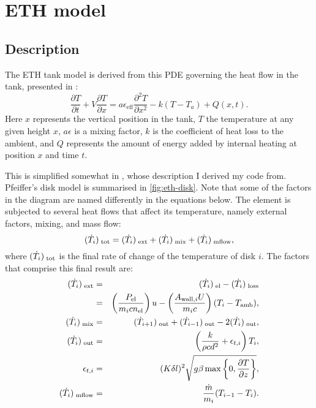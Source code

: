 \documentclass{article}
\begin{document}
\section{ETH model}

\subsection{Description}

The ETH tank model is derived from this PDE governing the heat flow in the tank, presented in \textcite{Vrettos12}:
\begin{equation} \label{eq:eth-pde}
   \frac{\partial T}{\partial t} + V \frac{\partial T}{\partial x}
   = a \epsilon_{\text{eff}} \frac{\partial^2 T}{\partial x^2}
   - k(T - T_a)
   + Q(x, t).
\end{equation}
Here $x$ represents the vertical position in the tank, $T$ the temperature at any given height $x$, $a\epsilon$ is a mixing factor, $k$ is the coefficient of heat loss to the ambient, and $Q$ represents the amount of energy added by internal heating at position $x$ and time $t$.

This is simplified somewhat in \textcite{Pfeiffer11}, whose description I derived my code from.
Pfeiffer's disk model is summarised in \autoref{fig:eth-disk}.
Note that some of the factors in the diagram are named differently in the equations below.
The element is subjected to several heat flows that affect its temperature, namely external factors, mixing, and mass flow:
\begin{equation}
   \label{eq:flow-total}
   \flow{tot} = \flow{ext} + \flow{mix} + \flow{mflow},
\end{equation}
where $(\dot{T}_{i})_{\;\text{tot}}$ is the final rate of change of the temperature of disk $i$.
The factors that comprise this final result are:
\begin{eqnarray}
   \label{eq:flow-ext}
   \flow{ext} &=& \flow{el} - \flow{loss} \nonumber\\
              &=& \left(\frac{P_{\text{el}}}{m_i c n_{\text{el}}}\right) u
                - \left(\frac{A_{\text{wall}, i} U}{m_i c}\right) (T_i - T_{\text{amb}}), \\
   \label{eq:flow-mix}
   \flow{mix} &=& \flow[i+1]{out} + \flow[i-1]{out} - 2 \flow{out}, \\
   \label{eq:flow-mix-out}
   \flow{out} &=& \left(\frac{k}{\rho c d^2} + \epsilon_{t, i}\right)T_i, \\
   \label{eq:epsilon}
   \epsilon_{t, i} &=& (K \delta l)^2 \sqrt{g \beta \max \left\{ 0, \frac{\partial T}{\partial z}\right\}}, \\
   \label{eq:flow-mflow}
   \flow{mflow} &=& \frac{\dot{m}}{m_i} (T_{i-1} - T_i).
\end{eqnarray}
\end{document}

